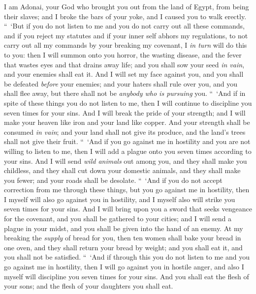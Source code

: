 \begin{biblechapter}
\verse I am Adonai, your God who brought you out from the land of Egypt, from being their slaves; and I broke the bars of your yoke, and I caused you to walk erectly.
 “ ‘But if you do not listen to me and you do not carry out all these commands,
\verse and if you reject my statutes and if your inner self abhors my regulations, to not carry out all my commands by your breaking my covenant,
\verse I \textit{in turn} will do this to you: then I will summon onto you horror, the wasting disease, and the fever that wastes eyes and that drains away life; and you shall sow your seed \textit{in vain}, and your enemies shall eat it.
\verse And I will set my face against you, and you shall be defeated \textit{before} your enemies; and your haters shall rule over you, and you shall flee away, but there shall not be \textit{anybody who is pursuing} you.
\verse “ ‘And if in spite of these things you do not listen to me, then I will continue to discipline you seven times for your sins.
\verse And I will break the pride of your strength; and I will make your heaven like iron and your land like copper.
\verse And your strength shall be consumed \textit{in vain}; and your land shall not give its produce, and the land’s trees shall not give their fruit.
\verse “ ‘And if you go against me in hostility and you are not willing to listen to me, then I will add a plague onto you seven times according to your sins.
\verse And I will send \textit{wild animals} out among you, and they shall make you childless, and they shall cut down your domestic animals, and they shall make you fewer; and your roads shall be desolate.
\verse “ ‘And if you do not accept correction from me through these things, but you go against me in hostility,
\verse then I myself will also go against you in hostility, and I myself also will strike you seven times for your sins.
\verse And I will bring upon you a sword that seeks vengeance for the covenant, and you shall be gathered to your cities; and I will send a plague in your midst, and you shall be given into the hand of an enemy.
\verse At my breaking the \textit{supply} of bread for you, then ten women shall bake your bread in one oven, and they shall return your bread by weight; and you shall eat it, and you shall not be satisfied.
\verse “ ‘And if through this you do not listen to me and you go against me in hostility,
\verse then I will go against you in hostile anger, and also I myself will discipline you seven times for your sins.
\verse And you shall eat the flesh of your sons; and the flesh of your daughters you shall eat.

\end{biblechapter}
